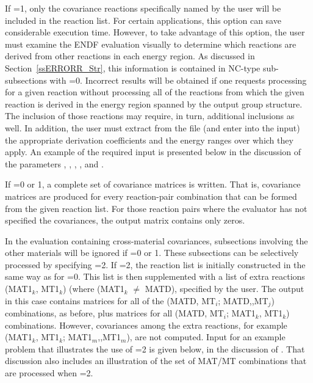 If =1, only the covariance reactions specifically
named by the user will be included in the reaction list.  For certain
applications, this option can save considerable execution time.
However, to take advantage of this option, the user must examine the
ENDF evaluation visually to determine which reactions are derived
from other reactions in each energy region.  As discussed in
Section~\ref{ssERRORR_Str}, this information is contained in NC-type
sub-subsections
with =0.  Incorrect results will be obtained if one requests
processing for a given reaction without processing all of the reactions
from which the given reaction is derived in the energy region spanned
by the output group structure.  The inclusion of those reactions may
require, in turn, additional inclusions as well.  In addition, the user
must extract from the file (and enter into the input) the appropriate
derivation coefficients and the energy ranges over which they
apply.  An example of the required input is presented below in the
discussion of the parameters , , ,
, and .

If =0 or 1, a complete set of covariance matrices
is written.  That is, covariance matrices are produced for
every reaction-pair combination that can be formed from the
given reaction list.  For those reaction pairs where the evaluator has
not specified the covariances, the output matrix contains only zeros.

In the evaluation containing cross-material covariances, subsections
involving the other materials will be ignored if =0 or
1.  These subsections can be selectively processed by
specifying =2.  If =2, the reaction list is
initially constructed in the same way as for =0.  This
list is then supplemented with a list of extra reactions (MAT1$_k$,
MT1$_k$) (where (MAT1$_k$ $\neq$ MATD), specified by the user.  The
output in this case contains matrices for all of the (MATD, MT$_i$;
MATD,,MT$_j$) combinations, as before, plus matrices for all
(MATD, MT$_i$; MAT1$_k$, MT1$_k$) combinations.  However, covariances
among the extra reactions, for example (MAT1$_k$, MT1$_k$;
MAT1$_m$,,MT1$_m$), are not computed.  Input for an example problem that
illustrates the use of =2 is given below, in the
discussion of .  That discussion also includes an
illustration of the set of MAT/MT combinations that
are processed when =2.

